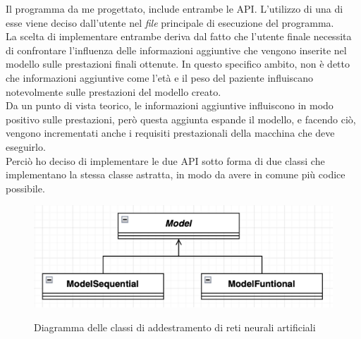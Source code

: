 Il programma da me progettato, include entrambe le API. L'utilizzo di una di esse viene deciso dall'utente nel \textit{file} principale di esecuzione del programma.\\
La scelta di implementare entrambe deriva dal fatto che l'utente finale necessita di confrontare l'influenza delle informazioni aggiuntive che vengono inserite nel modello sulle prestazioni finali ottenute. In questo specifico ambito, non è detto che informazioni aggiuntive come l'età e il peso del paziente influiscano notevolmente sulle prestazioni del modello creato.\\
Da un punto di vista teorico, le informazioni aggiuntive influiscono in modo positivo sulle prestazioni, però questa aggiunta espande il modello, e facendo ciò, vengono incrementati anche i requisiti prestazionali della macchina che deve eseguirlo.\\
Perciò ho deciso di implementare le due API sotto forma di due classi che implementano la stessa classe astratta, in modo da avere in comune più codice possibile.
\begin{figure}[H]
    \centering
    \includegraphics[alt={Diagramma delle classi di addestramento di reti neurali artificiali}, width=0.75\columnwidth]{img/model-diag.png}
    \caption{\centering Diagramma delle classi di addestramento di reti neurali artificiali}
    \label{fig:datasetgetter-diagram}
\end{figure}

